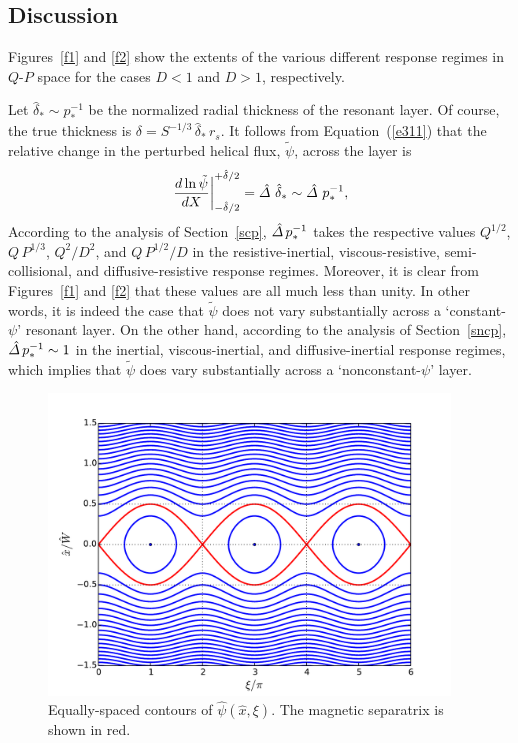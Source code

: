 \documentclass[notitlepage,12pt]{article}
\begin{document}
\subsection{Discussion}\label{dis1}
Figures~\ref{f1} and \ref{f2} show the extents of the various different response regimes in $Q$-$P$ space for the
cases $D<1$ and $D>1$, respectively. 

Let $\hat{\delta}_\ast\sim p_\ast^{-1}$ be the normalized radial thickness of the resonant layer.  Of course, the true thickness is
$\delta = S^{-1/3}\,\hat{\delta}_\ast\,r_s$.  It follows from
Equation~(\ref{e311}) that the relative change in the perturbed helical flux, $\tilde{\psi}$, across the layer
is
\begin{equation}
\left.\frac{d\ln\tilde{\psi}}{dX}\right|_{-\hat{\delta}/2}^{+\hat{\delta}/2} = \hat{\mit\Delta}\,\,\hat{\delta}_\ast\sim \hat{\mit\Delta}\,\,p_\ast^{-1},
\end{equation}
According to the  analysis of Section~\ref{scp}, $\hat{\mit\Delta}\,p_\ast^{-1}$ takes the respective values $Q^{1/2}$, $Q\,P^{1/3}$, 
$Q^2/D^2$, and $Q\,P^{1/2}/D$ in the resistive-inertial, viscous-resistive, semi-collisional, and
diffusive-resistive response regimes. Moreover, it is clear from Figures~\ref{f1} and \ref{f2} that these values are all
much less than unity. In other words, it is indeed the case that $\tilde{\psi}$ does not vary substantially across a
`constant-$\psi$' resonant layer. On the other hand, according to the analysis of Section~\ref{sncp}, $\hat{\mit\Delta}\,p_\ast^{-1}\sim 1$ in the inertial,
viscous-inertial, and diffusive-inertial response regimes, which implies that $\tilde{\psi}$ does vary substantially
across a `nonconstant-$\psi$' layer. 

\begin{figure}[t]
\centerline{\includegraphics[width=0.95\textwidth]{Island.pdf}}
\caption{Equally-spaced contours of $\hat{\psi}(\hat{x},\xi)$. The magnetic separatrix is shown in red. }\label{f2a}
\end{figure}
\end{document}
